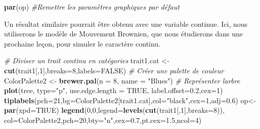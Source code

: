 \documentclass[
]{book}
\newenvironment{Shaded}{\begin{snugshade}}{\end{snugshade}}
\newcommand{\AttributeTok}[1]{\textcolor[rgb]{0.13,0.29,0.53}{#1}}
\newcommand{\CommentTok}[1]{\textcolor[rgb]{0.56,0.35,0.01}{\textit{#1}}}
\newcommand{\ConstantTok}[1]{\textcolor[rgb]{0.56,0.35,0.01}{#1}}
\newcommand{\DecValTok}[1]{\textcolor[rgb]{0.00,0.00,0.81}{#1}}
\newcommand{\FloatTok}[1]{\textcolor[rgb]{0.00,0.00,0.81}{#1}}
\newcommand{\FunctionTok}[1]{\textcolor[rgb]{0.13,0.29,0.53}{\textbf{#1}}}
\newcommand{\NormalTok}[1]{#1}
\newcommand{\OtherTok}[1]{\textcolor[rgb]{0.56,0.35,0.01}{#1}}
\newcommand{\StringTok}[1]{\textcolor[rgb]{0.31,0.60,0.02}{#1}}
\begin{document}
\begin{Shaded}
\begin{Highlighting}[]
\FunctionTok{par}\NormalTok{(op) }\CommentTok{\#Remettre les paramètres graphiques par défaut}
\end{Highlighting}
\end{Shaded}

Un résultat similaire pourrait être obtenu avec une variable continue. Ici, nous utiliserons le modèle de Mouvement Brownien, que nous étudierons dans une prochaine leçon, pour simuler le caractère continu.

\begin{Shaded}
\begin{Highlighting}[]
\CommentTok{\# Diviser un trait continu en catégories}
\NormalTok{trait1.cat }\OtherTok{\textless{}{-}} \FunctionTok{cut}\NormalTok{(trait1[,}\DecValTok{1}\NormalTok{],}\AttributeTok{breaks=}\DecValTok{8}\NormalTok{,}\AttributeTok{labels=}\ConstantTok{FALSE}\NormalTok{)}
\CommentTok{\# Créer une palette de couleur}
\NormalTok{ColorPalette2 }\OtherTok{\textless{}{-}} \FunctionTok{brewer.pal}\NormalTok{(}\AttributeTok{n =} \DecValTok{8}\NormalTok{, }\AttributeTok{name =} \StringTok{"Blues"}\NormalTok{)}
\CommentTok{\# Représenter l\textquotesingle{}arbre}
\FunctionTok{plot}\NormalTok{(tree, }\AttributeTok{type=}\StringTok{"p"}\NormalTok{, }\AttributeTok{use.edge.length =} \ConstantTok{TRUE}\NormalTok{, }\AttributeTok{label.offset=}\FloatTok{0.2}\NormalTok{,}\AttributeTok{cex=}\DecValTok{1}\NormalTok{)}
\FunctionTok{tiplabels}\NormalTok{(}\AttributeTok{pch=}\DecValTok{21}\NormalTok{,}\AttributeTok{bg=}\NormalTok{ColorPalette2[trait1.cat],}\AttributeTok{col=}\StringTok{"black"}\NormalTok{,}\AttributeTok{cex=}\DecValTok{1}\NormalTok{,}\AttributeTok{adj=}\FloatTok{0.6}\NormalTok{)}
\NormalTok{op}\OtherTok{\textless{}{-}}\FunctionTok{par}\NormalTok{(}\AttributeTok{xpd=}\ConstantTok{TRUE}\NormalTok{)}
\FunctionTok{legend}\NormalTok{(}\DecValTok{0}\NormalTok{,}\DecValTok{0}\NormalTok{,}\AttributeTok{legend=}\FunctionTok{levels}\NormalTok{(}\FunctionTok{cut}\NormalTok{(trait1[,}\DecValTok{1}\NormalTok{],}\AttributeTok{breaks=}\DecValTok{8}\NormalTok{)),}
       \AttributeTok{col=}\NormalTok{ColorPalette2,}\AttributeTok{pch=}\DecValTok{20}\NormalTok{,}\AttributeTok{bty=}\StringTok{"n"}\NormalTok{,}\AttributeTok{cex=}\FloatTok{0.7}\NormalTok{,}\AttributeTok{pt.cex=}\FloatTok{1.5}\NormalTok{,}\AttributeTok{ncol=}\DecValTok{4}\NormalTok{)}
\end{Highlighting}
\end{Shaded}
\end{document}
